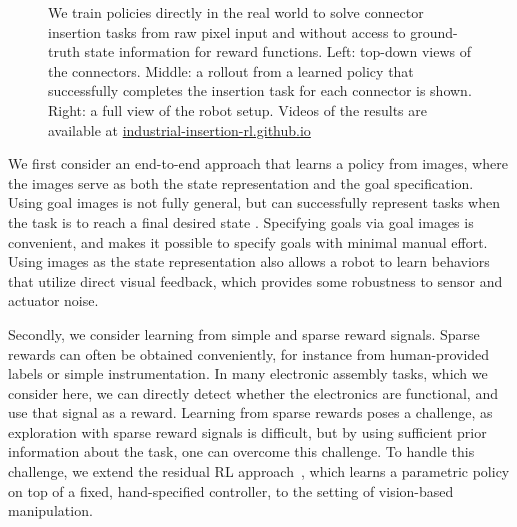 \begin{figure}[t]
\begin{subfigure}{0.69\linewidth}
\begin{subfigure}[b]{0.29\linewidth}
            \centering
        \end{subfigure}\hfill
    \end{subfigure}

\caption{We train policies directly in the real world to solve connector insertion tasks from raw pixel input and without access to ground-truth state information for reward functions. Left: top-down views of the connectors. Middle: a rollout from a learned policy that successfully completes the insertion task for each connector is shown. Right: a full view of the robot setup. Videos of the results are available at \href{https://industrial-insertion-rl.github.io/}{industrial-insertion-rl.github.io} }
    \label{fig:usb_photo_demo2}
\end{figure}

We first consider an end-to-end approach that learns a policy from images, where the images serve as both the state representation and the goal specification. Using goal images is not fully general, but can successfully represent tasks when the task is to reach a final desired state \cite{nair2018rig}.
Specifying goals via goal images is convenient, and makes it possible to specify goals with minimal manual effort. Using images as the state representation also allows a robot to learn behaviors that utilize direct visual feedback, which provides some robustness to sensor and actuator noise.

Secondly, we consider learning from simple and sparse reward signals. Sparse rewards can often be obtained conveniently, for instance from human-provided labels or simple instrumentation. In many electronic assembly tasks, which we consider here, we can directly detect whether the electronics are functional, and use that signal as a reward. Learning from sparse rewards poses a challenge, as exploration with sparse reward signals is difficult, but by using sufficient prior information about the task, one can overcome this challenge. To handle this challenge, we extend the residual RL approach~\cite{johannink18residualrl, silver18residualpolicylearning}, which learns a parametric policy on top of a fixed, hand-specified controller, to the setting of vision-based manipulation.

    
